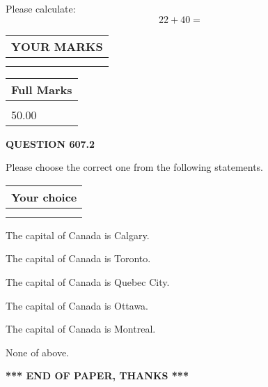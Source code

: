 \documentclass[12pt]{article}
\begin{document}
  
 
Please calculate:
\begin{equation}
22 +  %
40 = \nonumber
\end{equation}
 

 

 
  
\vspace{0.2in}
  
\noindent\begin{tabular}{|l|}
\hline
 YOUR MARKS  \\
\hline
 \\ 
 \\ 
\hline
\end{tabular}
\hspace{0.05in} \begin{tabular}{|l|}
\hline
 Full Marks  \\
\hline
 \\ 
50.00 \\
\hline
\end{tabular}
{\textbf{\Large{QUESTION
607.2 
}}}
  
  
Please choose the correct one from the following statements.
  
  
\noindent\hspace{3.0in} \begin{tabular}{|l|}
\hline
Your choice \\
\hline
 \\ 
 \\ 
\hline
\end{tabular}
  
  
 
 
The capital of Canada is Calgary.
 
 
The capital of Canada is Toronto.
 
 
The capital of Canada is Quebec City.
 
 
The capital of Canada is Ottawa.
 
 
The capital of Canada is Montreal.
 
 
 None of above.
 
 
   
   
 \vspace{0.2in}
 
   
   
   
   
\vspace{1.0in} 
{\textbf{\large{ *** END OF PAPER, THANKS *** }}} 
   
\end{document}
